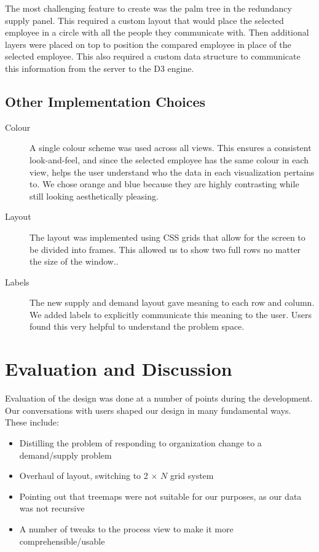 \documentclass[journal]{vgtc}                %
\begin{document}
The most challenging feature to create was the palm tree in the redundancy supply panel.  This required a custom layout that would place the selected employee in a circle with all the people they communicate with.  Then additional layers were placed on top to position the compared employee in place of the selected employee.  This also required a custom data structure to communicate this information from the server to the D3 engine.

\subsection{Other Implementation Choices}

\begin{description}
\item [Colour] A single colour scheme was used across all views. This ensures a consistent look-and-feel, and since the selected employee has the same colour in each view, helps the user understand who the data in each visualization pertains to. We chose orange and blue because they are highly contrasting while still looking aesthetically pleasing.
\item[Layout] The layout was implemented using CSS grids that allow for the screen to be divided into frames.  This allowed us to show two full rows no matter the size of the window..
\item[Labels] The new supply and demand layout gave meaning to each row and column. We added labels to explicitly communicate this meaning to the user.  Users found this very helpful to understand the problem space.
\end{description}

\section{Evaluation and Discussion}
\label{sec:evaldiscuss}

Evaluation of the design was done at a number of points during the development. Our conversations with users shaped our design in many fundamental ways. These include:

\begin{itemize}
\item Distilling the problem of responding to organization change to a demand/supply problem
\item Overhaul of layout, switching to 2 $\times$ $N$ grid system
\item Pointing out that treemaps were not suitable for our purposes, as our data was not recursive
\item A number of tweaks to the process view to make it more comprehensible/usable
\end{itemize}
\end{document}
